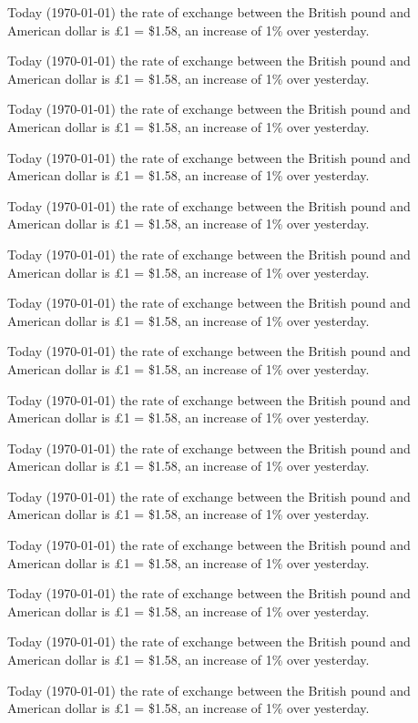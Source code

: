 \documentclass[twoside]{article}
\begin{document}
Today (\today) the rate of exchange between the British
pound and American dollar is \pounds 1 = \$1.58, an
increase of 1\% over yesterday.

Today (\today) the rate of exchange between the British
pound and American dollar is \pounds 1 = \$1.58, an
increase of 1\% over yesterday.

Today (\today) the rate of exchange between the British
pound and American dollar is \pounds 1 = \$1.58, an
increase of 1\% over yesterday.

Today (\today) the rate of exchange between the British
pound and American dollar is \pounds 1 = \$1.58, an
increase of 1\% over yesterday.

Today (\today) the rate of exchange between the British
pound and American dollar is \pounds 1 = \$1.58, an
increase of 1\% over yesterday.

Today (\today) the rate of exchange between the British
pound and American dollar is \pounds 1 = \$1.58, an
increase of 1\% over yesterday.

Today (\today) the rate of exchange between the British
pound and American dollar is \pounds 1 = \$1.58, an
increase of 1\% over yesterday.

Today (\today) the rate of exchange between the British
pound and American dollar is \pounds 1 = \$1.58, an
increase of 1\% over yesterday.

Today (\today) the rate of exchange between the British
pound and American dollar is \pounds 1 = \$1.58, an
increase of 1\% over yesterday.

Today (\today) the rate of exchange between the British
pound and American dollar is \pounds 1 = \$1.58, an
increase of 1\% over yesterday.

Today (\today) the rate of exchange between the British
pound and American dollar is \pounds 1 = \$1.58, an
increase of 1\% over yesterday.

Today (\today) the rate of exchange between the British
pound and American dollar is \pounds 1 = \$1.58, an
increase of 1\% over yesterday.

Today (\today) the rate of exchange between the British
pound and American dollar is \pounds 1 = \$1.58, an
increase of 1\% over yesterday.

Today (\today) the rate of exchange between the British
pound and American dollar is \pounds 1 = \$1.58, an
increase of 1\% over yesterday.

Today (\today) the rate of exchange between the British
pound and American dollar is \pounds 1 = \$1.58, an
increase of 1\% over yesterday.
\end{document}
